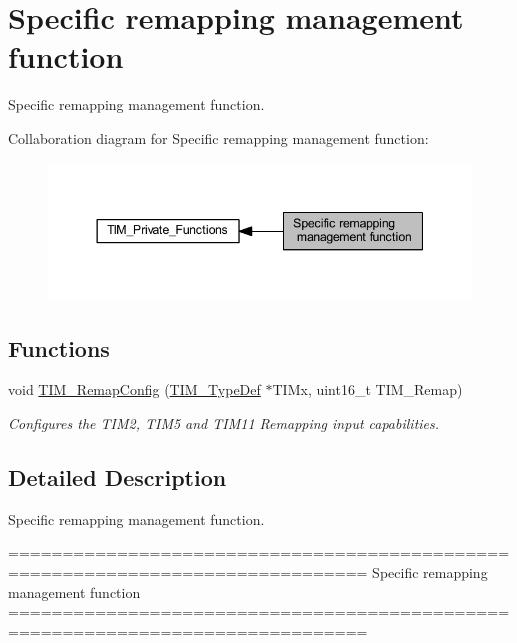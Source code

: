 \hypertarget{group___t_i_m___group9}{}\section{Specific remapping management function}
\label{group___t_i_m___group9}


Specific remapping management function.  


Collaboration diagram for Specific remapping management function\+:\nopagebreak
\begin{figure}[H]
\begin{center}
\leavevmode
\includegraphics[width=344pt]{group___t_i_m___group9}
\end{center}
\end{figure}
\subsection*{Functions}
\begin{DoxyCompactItemize}
\item 
void \hyperlink{group___t_i_m___group9_ga08ffb6f2bfa96b6fbcbb8d8001cb8ba9}{T\+I\+M\+\_\+\+Remap\+Config} (\hyperlink{struct_t_i_m___type_def}{T\+I\+M\+\_\+\+Type\+Def} $\ast$T\+I\+Mx, uint16\+\_\+t T\+I\+M\+\_\+\+Remap)
\begin{DoxyCompactList}\small\item\em Configures the T\+I\+M2, T\+I\+M5 and T\+I\+M11 Remapping input capabilities. \end{DoxyCompactList}\end{DoxyCompactItemize}


\subsection{Detailed Description}
Specific remapping management function. 

\begin{DoxyVerb} ===============================================================================
                     Specific remapping management function
 ===============================================================================  \end{DoxyVerb}
 

